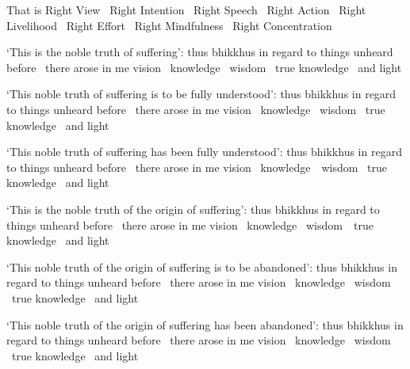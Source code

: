 \begin{english-only-hang}
  That is Right View \breathmark\ Right Intention \breathmark\ Right Speech \breathmark\ Right Action \breathmark\ Right Livelihood \breathmark\ Right Effort \breathmark\ Right Mindfulness \breathmark\ Right Concentration
\end{english-only-hang}

\begin{english-only-hang}
  `This is the noble truth of suffering': thus bhikkhus in regard to things unheard before \breathmark\ there arose in me vision \breathmark\ knowledge \breathmark\ wisdom \breathmark\ true knowledge \breathmark\ and light
\end{english-only-hang}

\begin{english-only-hang}
  `This noble truth of suffering is to be fully understood': thus bhikkhus in regard to things unheard before \breathmark\ there arose in me vision \breathmark\ knowledge \breathmark\ wisdom \breathmark\ true knowledge \breathmark\ and light
\end{english-only-hang}

\begin{english-only-hang}
  `This noble truth of suffering has been fully understood': thus bhikkhus in regard to things unheard before \breathmark\ there arose in me vision \breathmark\ \mbox{knowledge}~\breathmark\ wisdom \breathmark\ true knowledge \breathmark\ and light
\end{english-only-hang}

\begin{english-only-hang}
  `This is the noble truth of the origin of suffering': thus bhikkhus in regard to things unheard before \breathmark\ there arose in me vision \breathmark\ knowledge \breathmark\ \mbox{wisdom}~\breathmark\ true knowledge \breathmark\ and light
\end{english-only-hang}

\begin{english-only-hang}
  `This noble truth of the origin of suffering is to be abandoned': thus bhikkhus in regard to things unheard before \breathmark\ there arose in me vision \breathmark\ knowledge \breathmark\ wisdom \breathmark\ true knowledge \breathmark\ and light
\end{english-only-hang}

\begin{english-only-hang}
  `This noble truth of the origin of suffering has been abandoned': thus bhikkhus in regard to things unheard before \breathmark\ there arose in me vision \breathmark\ knowledge \breathmark\ wisdom \breathmark\ true knowledge \breathmark\ and light
\end{english-only-hang}

